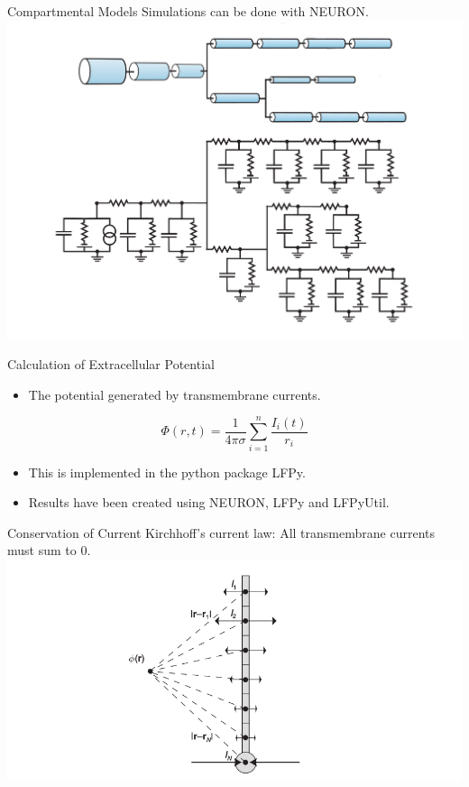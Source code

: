 \documentclass{beamer}
\begin{document}
\begin{frame}{Compartmental Models}
    \centering
    Simulations can be done with NEURON.
    \includegraphics[width=\textwidth]{images/compartment_circuit_big.png}

\end{frame}

\begin{frame}{Calculation of Extracellular Potential}
    \begin{itemize}
        \item The potential generated by transmembrane currents.
    \end{itemize}
    $$\Phi(r,t) = \frac{1}{4\pi\sigma} \sum_{i=1}^n \frac{I_i(t)}{r_i} $$
    \begin{itemize}
        \item This is implemented in the python package LFPy.
        \item Results have been created using NEURON, LFPy and LFPyUtil.
    \end{itemize}
\end{frame}

\begin{frame}{Conservation of Current}
    Kirchhoff's current law: All transmembrane currents must sum to 0.
    \centering
    \includegraphics[width=\textwidth]{images/kirchhoff_current.png}
\end{frame}
\end{document}
